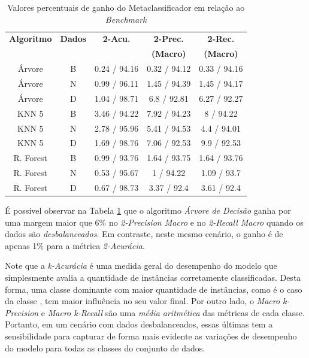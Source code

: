 \begin{table}[h!]
  \begin{center}
   \resizebox{\textwidth}{!} {
   \begin{tabular}{ccccc}
      \hline
      \textbf{Algoritmo} & \textbf{Dados} &  \textbf{2-Acu.} & \textbf{2-Prec.} & \textbf{2-Rec.} \\
          &     &    & \textbf{(Macro)} & \textbf{(Macro)} \\
      \hline

Árvore	&	B	&	0.24 / 94.16	&	0.32 / 94.12	&	0.33 / 94.16	\\
Árvore	&	N	&	0.99 / 96.11	&	1.45 / 94.39	&	1.45 / 94.17	\\
Árvore	&	D	&	1.04 / 98.71	&	6.8 / 92.81	&	6.27 / 92.27	\\
KNN 5	&	B	&	3.46 / 94.22	&	7.92 / 94.23	&	8 / 94.22	\\
KNN 5	&	N	&	2.78 / 95.96	&	5.41 / 94.53	&	4.4 / 94.01	\\
KNN 5	&	D	&	1.69 / 98.76	&	7.06 / 92.53	&	9.9 / 92.53	\\
R. Forest	&	B	&	0.99 / 93.76	&	1.64 / 93.75	&	1.64 / 93.76	\\
R. Forest	&	N	&	0.53 / 95.67	&	1 / 94.22	&	1.09 / 93.7	\\
R. Forest	&	D	&	0.67 / 98.73	&	3.37 / 92.4	&	3.61 / 92.4	\\

      \hline
    \end{tabular}
    }
    \caption{Valores percentuais de ganho do Metaclassificador em relação ao \textit{Benchmark}}
    \label{tab:ganho_meta}
  \end{center}
\end{table}

É possível observar na Tabela \ref{tab:ganho_meta} que o algoritmo \textit{Árvore de Decisão } ganha por uma margem maior que 6\% no \textit{2-Precision Macro} e no \textit{2-Recall Macro} quando os dados são \textit{desbalanceados}.
Em contraste, neste mesmo cenário, o ganho é de apenas 1\% para a métrica \textit{2-Acurácia}.

Note que a \textit{k-Acurácia} é uma medida geral do desempenho do modelo que simplesmente avalia a quantidade de instâncias corretamente classificadas.
Desta forma, uma classe dominante com maior quantidade de instâncias, como é o caso da classe , tem maior influência no seu valor final.
Por outro lado, o \textit{Macro k-Precision} e \textit{Macro k-Recall} são uma \textit{média aritmética} das métricas de cada classe.
Portanto, em um cenário com dados desbalanceados, essas últimas tem a sensibilidade para capturar de forma mais evidente as variações de desempenho do modelo para todas as classes do conjunto de dados.

